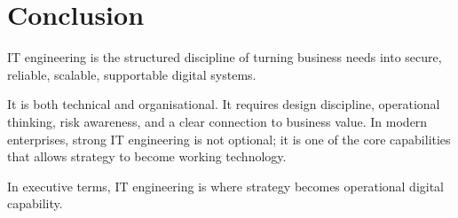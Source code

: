 \documentclass[
  british,
  letterpaper,
  DIV=11,
  numbers=noendperiod]{scrartcl}
\begin{document}
\section{Conclusion}\label{conclusion}

IT engineering is the structured discipline of turning business needs
into secure, reliable, scalable, supportable digital systems.

It is both technical and organisational. It requires design discipline,
operational thinking, risk awareness, and a clear connection to business
value. In modern enterprises, strong IT engineering is not optional; it
is one of the core capabilities that allows strategy to become working
technology.

In executive terms, IT engineering is where strategy becomes operational
digital capability.
\end{document}
